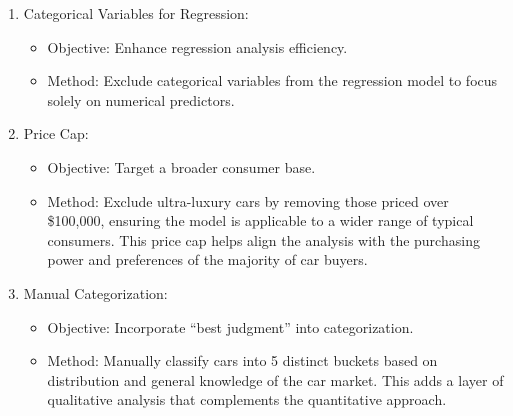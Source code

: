 \documentclass{article}
\begin{document}
\begin{enumerate}
    \item Categorical Variables for Regression:
    \begin{itemize}
        \item Objective: Enhance regression analysis efficiency.
        \item Method: Exclude categorical variables from the regression model to focus solely on numerical predictors.
    \end{itemize}
    
    \item Price Cap:
    \begin{itemize}
        \item Objective: Target a broader consumer base.
        \item Method: Exclude ultra-luxury cars by removing those priced over \$100,000, ensuring the model is applicable to a wider range of typical consumers. This price cap helps align the analysis with the purchasing power and preferences of the majority of car buyers.
    \end{itemize}

    \item Manual Categorization:
    \begin{itemize}
        \item Objective: Incorporate “best judgment” into categorization.
        \item Method: Manually classify cars into 5 distinct buckets based on distribution and general knowledge of the car market. This adds a layer of qualitative analysis that complements the quantitative approach.
    \end{itemize}
    
\end{enumerate}
\end{document}
